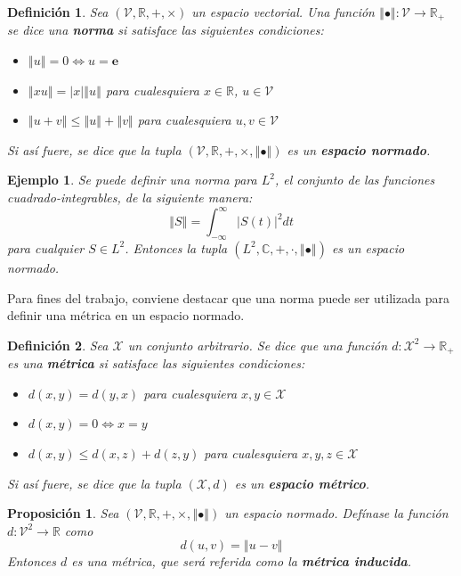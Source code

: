 \documentclass[12pt,letterpaper]{book}
\newtheorem{definicion}{Definición}[chapter]
\newtheorem{proposicion}[teorema]{Proposición}
\newtheorem{ejemplo}{Ejemplo}[chapter]
\newcommand{\R}{\mathbb{R}}
\newcommand{\C}{\mathbb{C}}
\newcommand{\intR}{\int_{-\infty}^{\infty}}
\newcommand{\abso}[1]{\left| #1 \right|}
\newcommand{\norma}[1]{\left\Vert #1 \right\Vert}
\begin{document}
\begin{definicion}
Sea $(\mathcal{V},\R,+,\times)$ un espacio vectorial. Una función $\norma{\bullet}: \mathcal{V}\rightarrow\R_+$ se dice una \textbf{norma} si satisface las siguientes condiciones:
\begin{itemize}
\item $\norma{u} = 0 \Leftrightarrow u = \boldsymbol{e}$
\item $\norma{x u} = \abso{x} \norma{u}$ para cualesquiera $x \in \R$, $u \in \mathcal{V}$
\item $\norma{u+v} \leq \norma{u} + \norma{v}$ para cualesquiera $u, v \in \mathcal{V}$
\end{itemize}
Si así fuere, se dice que la tupla $(\mathcal{V},\R,+,\times, \norma{\bullet})$ es un \textbf{espacio normado}.
\end{definicion}

\begin{ejemplo}
Se puede definir una norma para $L^{2}$, el conjunto de las funciones cuadrado-integrables, de la siguiente manera:
\begin{equation}
\norma{S} = \intR \abso{S(t)}^{2} dt
\end{equation} 
para cualquier $S \in L^{2}$. Entonces la tupla $(L^{2},\C,+,\cdot,\norma{\bullet})$ es un espacio normado.
\label{ejemplo:norma_L2}
\end{ejemplo}

Para fines del trabajo, conviene destacar que una norma puede ser utilizada para definir una métrica en un espacio normado.

\begin{definicion}
Sea $\mathcal{X}$ un conjunto arbitrario. Se dice que una función $d: \mathcal{X}^{2}\rightarrow \R_+$ es una \textbf{métrica} si satisface las siguientes condiciones:
\begin{itemize}
\item $d(x,y) = d(y,x)$ para cualesquiera $x,y \in \mathcal{X}$
\item $d(x,y)=0 \Leftrightarrow x=y$
\item $d(x,y) \leq d(x,z) + d(z,y)$ para cualesquiera $x,y,z \in \mathcal{X}$
\end{itemize}
Si así fuere, se dice que la tupla $(\mathcal{X},d)$ es un \textbf{espacio métrico}.
\end{definicion}

\begin{proposicion}
Sea $(\mathcal{V},\R,+,\times, \norma{\bullet})$ un espacio normado. Defínase la función $d: \mathcal{V}^{2} \rightarrow \R$ como
\begin{equation}
d(u,v) = \norma{u-v}
\end{equation}
Entonces $d$ es una métrica, que será referida como la \textbf{métrica inducida}.
\end{proposicion}
\end{document}

